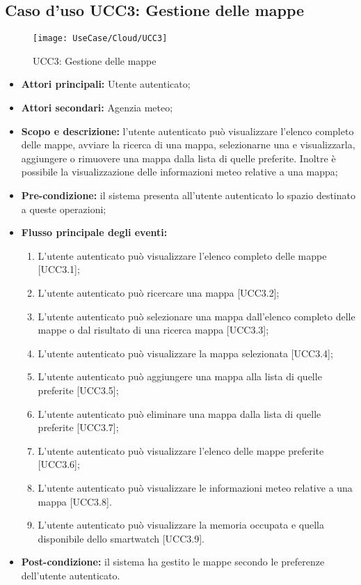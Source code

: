 \subsection{Caso d'uso UCC3: Gestione delle mappe}

\begin{figure}[H]
\centering
\texttt{[image: UseCase/Cloud/UCC3]}
\caption{UCC3: Gestione delle mappe}
\end{figure}

\begin{itemize}
\item \textbf{Attori principali:} Utente autenticato;
\item \textbf{Attori secondari:} Agenzia meteo;
\item \textbf{Scopo e descrizione:} l'utente autenticato può visualizzare l'elenco completo delle mappe, avviare la ricerca di una mappa, selezionarne una e visualizzarla, aggiungere o rimuovere una mappa dalla lista di quelle preferite. Inoltre è possibile la visualizzazione delle informazioni meteo relative a una mappa;
\item \textbf{Pre-condizione:} il sistema presenta all'utente autenticato lo spazio destinato a queste operazioni;
\item \textbf{Flusso principale degli eventi:}
\begin{enumerate}
\item L'utente autenticato può visualizzare l'elenco completo delle mappe [UCC3.1];
\item L'utente autenticato può ricercare una mappa [UCC3.2];
\item L'utente autenticato può selezionare una mappa dall'elenco completo delle mappe o dal risultato di una ricerca mappa [UCC3.3];
\item L'utente autenticato può visualizzare la mappa selezionata [UCC3.4];
\item L'utente autenticato può aggiungere una mappa alla lista di quelle preferite [UCC3.5];
\item L'utente autenticato può eliminare una mappa dalla lista di quelle preferite [UCC3.7];
\item L'utente autenticato può visualizzare l'elenco delle mappe preferite [UCC3.6];
\item L'utente autenticato può visualizzare le informazioni meteo relative a una mappa [UCC3.8].
\item L'utente autenticato può visualizzare la memoria occupata e quella disponibile dello smartwatch [UCC3.9].
\end{enumerate}
\item \textbf{Post-condizione:} il sistema ha gestito le mappe secondo le preferenze dell'utente autenticato.
\end{itemize}

